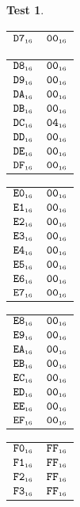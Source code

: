 \documentclass[a4paper,12pt]{article}
\makeatletter
\newcommand{\num}[1]{\texttt{#1}}
\newcommand{\hex}[1]{\num{#1}_{\textup{\tiny 16}}}
\newcommand{\MEM}[1]{\ifthenelse{\equal{#1}{}}{M}{M[#1]}}
\theoremstyle{definition}
\newtheorem{test}{Test}
\newenvironment{memtable}{%
  \begin{trivlist}
    \item
    }{%
    \end{trivlist}}
\newenvironment{memcolumn}{%
  \begin{tabular}{@{}ll@{}}
    \hline}
    {%
    \hline
  \end{tabular}}
\newcommand{\memspace}{\qquad}
\makeatother
\begin{document}
\begin{test}
\begin{memtable}
\begin{memcolumn}
      $\hex{D7}$ & $\hex{00}$ \\
    \end{memcolumn}
    \memspace
    \begin{memcolumn}
      $\hex{D8}$ & $\hex{00}$ \\
      $\hex{D9}$ & $\hex{00}$ \\
      $\hex{DA}$ & $\hex{00}$ \\
      $\hex{DB}$ & $\hex{00}$ \\
      $\hex{DC}$ & $\hex{04}$ \\
      $\hex{DD}$ & $\hex{00}$ \\
      $\hex{DE}$ & $\hex{00}$ \\
      $\hex{DF}$ & $\hex{00}$ \\
    \end{memcolumn}
    \memspace
    \begin{memcolumn}
      $\hex{E0}$ & $\hex{00}$ \\
      $\hex{E1}$ & $\hex{00}$ \\
      $\hex{E2}$ & $\hex{00}$ \\
      $\hex{E3}$ & $\hex{00}$ \\
      $\hex{E4}$ & $\hex{00}$ \\
      $\hex{E5}$ & $\hex{00}$ \\
      $\hex{E6}$ & $\hex{00}$ \\
      $\hex{E7}$ & $\hex{00}$ \\
    \end{memcolumn}
    \memspace
    \begin{memcolumn}
      $\hex{E8}$ & $\hex{00}$ \\
      $\hex{E9}$ & $\hex{00}$ \\
      $\hex{EA}$ & $\hex{00}$ \\
      $\hex{EB}$ & $\hex{00}$ \\
      $\hex{EC}$ & $\hex{00}$ \\
      $\hex{ED}$ & $\hex{00}$ \\
      $\hex{EE}$ & $\hex{00}$ \\
      $\hex{EF}$ & $\hex{00}$ \\
    \end{memcolumn}
    \memspace
    \begin{memcolumn}
      $\hex{F0}$ & $\hex{FF}$ \\
      $\hex{F1}$ & $\hex{FF}$ \\
      $\hex{F2}$ & $\hex{FF}$ \\
      $\hex{F3}$ & $\hex{FF}$ \\

\end{memcolumn}
\end{memtable}
\end{test}
\end{document}

